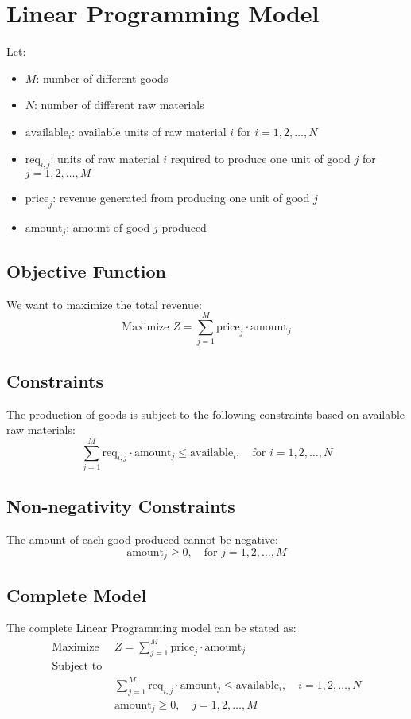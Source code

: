 \documentclass{article}
\begin{document}
\section*{Linear Programming Model}

Let:
\begin{itemize}
    \item \( M \): number of different goods
    \item \( N \): number of different raw materials
    \item \( \text{available}_i \): available units of raw material \( i \) for \( i = 1, 2, \ldots, N \)
    \item \( \text{req}_{i,j} \): units of raw material \( i \) required to produce one unit of good \( j \) for \( j = 1, 2, \ldots, M \)
    \item \( \text{price}_j \): revenue generated from producing one unit of good \( j \)
    \item \( \text{amount}_j \): amount of good \( j \) produced
\end{itemize}

\subsection*{Objective Function}
We want to maximize the total revenue:
\[
\text{Maximize } Z = \sum_{j=1}^{M} \text{price}_j \cdot \text{amount}_j
\]

\subsection*{Constraints}
The production of goods is subject to the following constraints based on available raw materials:
\[
\sum_{j=1}^{M} \text{req}_{i,j} \cdot \text{amount}_j \leq \text{available}_i, \quad \text{for } i = 1, 2, \ldots, N
\]

\subsection*{Non-negativity Constraints}
The amount of each good produced cannot be negative:
\[
\text{amount}_j \geq 0, \quad \text{for } j = 1, 2, \ldots, M
\]

\subsection*{Complete Model}
The complete Linear Programming model can be stated as:
\[
\begin{align*}
\text{Maximize } & Z = \sum_{j=1}^{M} \text{price}_j \cdot \text{amount}_j \\
\text{Subject to } & \\
& \sum_{j=1}^{M} \text{req}_{i,j} \cdot \text{amount}_j \leq \text{available}_i, \quad i = 1, 2, \ldots, N \\
& \text{amount}_j \geq 0, \quad j = 1, 2, \ldots, M
\end{align*}
\]
\end{document}
